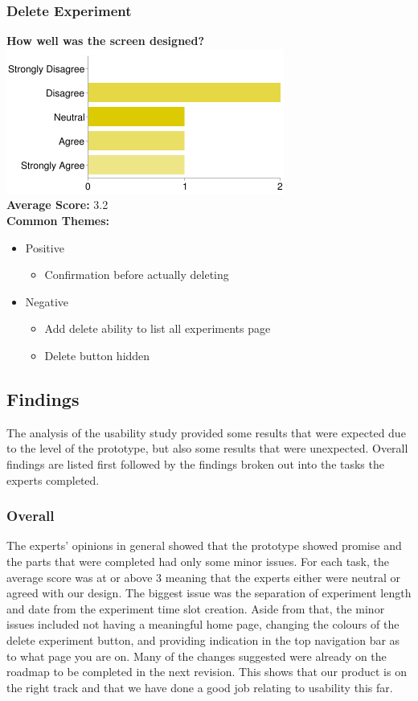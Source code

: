 \subsubsection{Delete Experiment}
\textbf{How well was the screen designed?}\\
\includegraphics[page=1,scale=0.65]{../other/usability-report-charts/delete_experiment_bar_chart}\\
\textbf{Average Score:} 3.2\\
\textbf{Common Themes:}
\begin{itemize}
\item Positive
\begin{itemize}
\item Confirmation before actually deleting
\end{itemize}
\item Negative
\begin{itemize}
\item Add delete ability to list all experiments page
\item Delete button hidden
\end{itemize}
\end{itemize}

\subsection{Findings}
The analysis of the usability study provided some results that were expected due to the level of the prototype, but also some results that were unexpected. Overall findings are listed first followed by the findings broken out into the tasks the experts completed.

\subsubsection{Overall}
The experts' opinions in general showed that the prototype showed promise and the parts that were completed had only some minor issues. For each task, the average score was at or above 3 meaning that the experts either were neutral or agreed with our design. The biggest issue was the separation of experiment length and date from the experiment time slot creation. Aside from that, the minor issues included not having a meaningful home page, changing the colours of the delete experiment button, and providing indication in the top navigation bar as to what page you are on. Many of the changes suggested were already on the roadmap to be completed in the next revision. This shows that our product is on the right track and that we have done a good job relating to usability this far.

